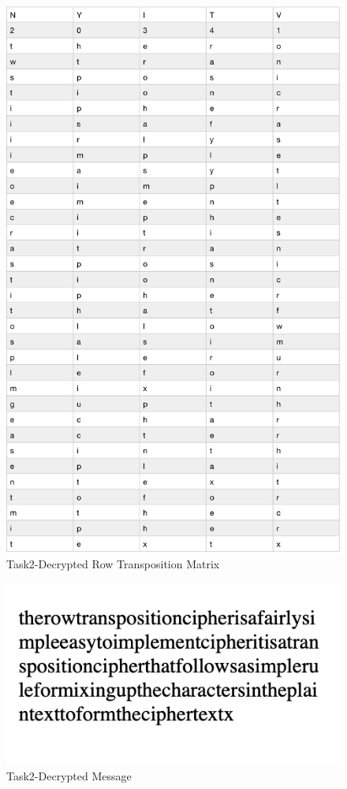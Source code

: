 \documentclass[twoside,twocolumn]{article}
\begin{document}
\begin{figure}[H]
  \centering
  \includegraphics[scale=0.39]{./Graphs/Figure1.8.png}
  \caption{Task2-Decrypted Row Transposition Matrix \\}
  \label{fig:testfig1}
\end{figure}


\begin{figure}[H]
  \centering
  \includegraphics[scale=0.75]{./Graphs/Figure1.9.png}
  \caption{Task2-Decrypted Message}
  \label{fig:testfig1}
\end{figure}
\end{document}
